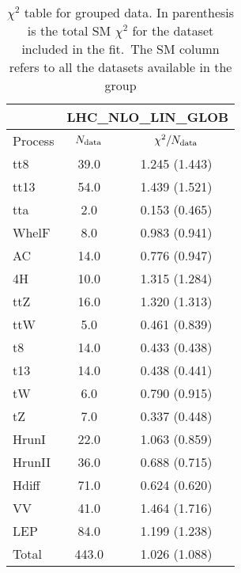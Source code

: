\documentclass{article}
\begin{document}
\begin{table}[H]
\centering
\begin{tabular}{|l|c|c|}
\hline
& \multicolumn{2}{c|}{LHC_NLO_LIN_GLOB}\\ \hline
Process  & $N_{\rm data}$ & $\chi^2/N_{\rm data}$\\ \hline
tt8 & 39.0                         & 1.245                             (1.443) \\ \hline
tt13 & 54.0                         & 1.439                             (1.521) \\ \hline
tta & 2.0                         & 0.153                             (0.465) \\ \hline
WhelF & 8.0                         & 0.983                             (0.941) \\ \hline
AC & 14.0                         & 0.776                             (0.947) \\ \hline
4H & 10.0                         & 1.315                             (1.284) \\ \hline
ttZ & 16.0                         & 1.320                             (1.313) \\ \hline
ttW & 5.0                         & 0.461                             (0.839) \\ \hline
t8 & 14.0                         & 0.433                             (0.438) \\ \hline
t13 & 14.0                         & 0.438                             (0.441) \\ \hline
tW & 6.0                         & 0.790                             (0.915) \\ \hline
tZ & 7.0                         & 0.337                             (0.448) \\ \hline
HrunI & 22.0                         & 1.063                             (0.859) \\ \hline
HrunII & 36.0                         & 0.688                             (0.715) \\ \hline
Hdiff & 71.0                         & 0.624                             (0.620) \\ \hline
VV & 41.0                         & 1.464                             (1.716) \\ \hline
LEP & 84.0                         & 1.199                             (1.238) \\ \hline
 \hline Total & 443.0                 & 1.026                     (1.088) \\ \hline
\end{tabular}
\caption{$\chi^2$ table for grouped data. In parenthesis is the total SM $\chi^2$ for the dataset included in the fit.\
                    The SM column refers to all the datasets available in the group}
\end{table}
\end{document}
